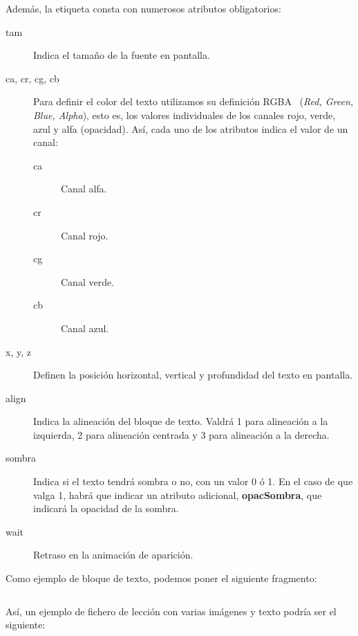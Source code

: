 Además, la etiqueta consta con numerosos atributos obligatorios:
\begin{description}
\item[tam] Indica el tamaño de la fuente en pantalla.
\item[ca, cr, cg, cb] Para definir el color del texto utilizamos su definición
  RGBA~\cite{rgba} (\textit{Red, Green, Blue, Alpha}), esto es, los
  valores individuales de los canales rojo, verde, azul y alfa (opacidad). Así,
  cada uno de los atributos indica el valor de un canal:
  \begin{description}
  \item[ca] Canal alfa.
  \item[cr] Canal rojo.
  \item[cg] Canal verde.
  \item[cb] Canal azul.
  \end{description}
\item[x, y, z] Definen la posición horizontal, vertical y profundidad del texto
  en pantalla.
\item[align] Indica la alineación del bloque de texto. Valdrá 1 para alineación
  a la izquierda, 2 para alineación centrada y 3 para alineación a la derecha.
\item[sombra] Indica si el texto tendrá sombra o no, con un valor 0 ó 1. En el
  caso de que valga 1, habrá que indicar un atributo adicional,
  \textbf{opacSombra}, que indicará la opacidad de la sombra.
\item[wait] Retraso en la animación de aparición.
\end{description}

Como ejemplo de bloque de texto, podemos poner el siguiente fragmento:

\inputminted{xml}{apendice_manual_lecciones/snippet_5}

Así, un ejemplo de fichero de lección con varias imágenes y texto podría ser el
siguiente:

\inputminted{xml}{apendice_manual_lecciones/snippet_6}

